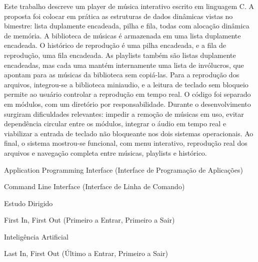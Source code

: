 \documentclass[
    12pt
    ,oneside
    ,a4paper
    ,chapter=TITLE
    ,section=TITLE
    ,sumario=abnt-6027-2012]{abntex2}
\begin{document}

\imprimircapa
\imprimirfolhaderosto

\begin{resumo}
Este trabalho descreve um player de música interativo escrito em linguagem C. A proposta foi colocar em prática as estruturas de dados dinâmicas vistas no bimestre: lista duplamente encadeada, pilha e fila, todas com alocação dinâmica de memória. A biblioteca de músicas é armazenada em uma lista duplamente encadeada. O histórico de reprodução é uma pilha encadeada, e a fila de reprodução, uma fila encadeada. As playlists também são listas duplamente encadeadas, mas cada uma mantém internamente uma lista de invólucros, que apontam para as músicas da biblioteca sem copiá-las. Para a reprodução dos arquivos, integrou-se a biblioteca miniaudio, e a leitura de teclado sem bloqueio permite ao usuário controlar a reprodução em tempo real. O código foi separado em módulos, com um diretório por responsabilidade. Durante o desenvolvimento surgiram dificuldades relevantes: impedir a remoção de músicas em uso, evitar dependência circular entre os módulos, integrar o áudio em tempo real e viabilizar a entrada de teclado não bloqueante nos dois sistemas operacionais. Ao final, o sistema mostrou-se funcional, com menu interativo, reprodução real dos arquivos e navegação completa entre músicas, playlists e histórico.

\end{resumo}


\begin{siglas}
    \item[API] Application Programming Interface (Interface de Programação de Aplicações)
    \item[CLI] Command Line Interface (Interface de Linha de Comando)
    \item[ED] Estudo Dirigido
    \item[FIFO] First In, First Out (Primeiro a Entrar, Primeiro a Sair)
    \item[IA] Inteligência Artificial
    \item[LIFO] Last In, First Out (Último a Entrar, Primeiro a Sair)
\end{siglas}
\end{document}
